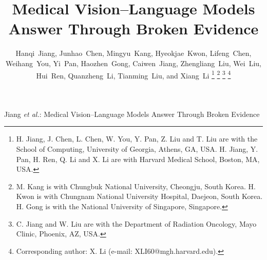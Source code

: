 

\title{Medical Vision--Language Models\\
Answer Through Broken Evidence}

\author{Hanqi~Jiang, Junhao~Chen, Mingyu~Kang, Hyeokjae~Kwon, Lifeng~Chen, Weihang~You, Yi~Pan, Haozhen~Gong, Caiwen~Jiang, Zhengliang~Liu, Wei~Liu, Hui~Ren, Quanzheng~Li, Tianming~Liu, and Xiang~Li
\versionthanks
\thanks{H. Jiang, J. Chen, L. Chen, W. You, Y. Pan, Z. Liu and T. Liu are with the School of
Computing, University of Georgia, Athens, GA, USA. H. Jiang, Y. Pan, H. Ren,
Q. Li and X. Li are with Harvard Medical School, Boston, MA, USA.}
\thanks{M. Kang is with Chungbuk National University, Cheongju, South Korea.
H. Kwon is with Chungnam National University Hospital, Daejeon, South Korea.
H. Gong is with the National University of Singapore, Singapore.}
\thanks{C. Jiang and W. Liu are with the Department of Radiation Oncology,
Mayo Clinic, Phoenix, AZ, USA.}
\thanks{Corresponding author: X. Li (e-mail: XLI60@mgh.harvard.edu).}}

\markboth{\runninghead}%
{Jiang \MakeLowercase{\textit{et al.}}: Medical Vision--Language Models Answer Through Broken Evidence}

\maketitle

